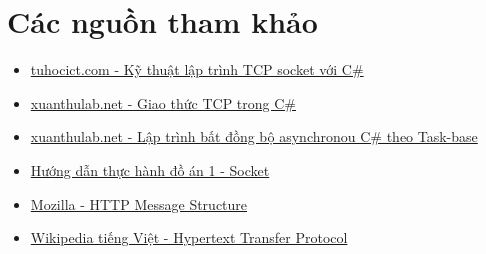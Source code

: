 \documentclass[14pt, a4paper]{extarticle}
\begin{document}
\section{Các nguồn tham khảo}
\begin{itemize}
    \item \href{https://tuhocict.com/ky-thuat-lap-trinh-voi-tcp-socket/}{tuhocict.com - Kỹ thuật lập trình TCP socket với C\#}
    \item \href{https://xuanthulab.net/networking-giao-thuc-tcp-voi-cac-lop-tcplistener-tcpclient-va-cac-lop-uri-ipaddress-c-c-sharp.html}{xuanthulab.net - Giao thức TCP trong C\#}
    \item \href{https://xuanthulab.net/lap-trinh-bat-dong-bo-asynchronou-c-c-sharp-voi-bat-dong-bo-theo-mo-hinh-tac-vu.html}{xuanthulab.net - Lập trình bất đồng bộ asynchronou C\# theo Task-base}
    \item \href{https://docs.google.com/document/d/1mjws5-vU9mzq9QgmrwzM3hi9A93vp77mgJK-Cjmy5Cs/edit#heading=h.cfrw1cej12t6}{Hướng dẫn thực hành đồ án 1 - Socket}
    \item \href{https://developer.mozilla.org/en-US/docs/Web/HTTP/Messages}{Mozilla - HTTP Message Structure}
    \item \href{https://vi.wikipedia.org/wiki/Hypertext_Transfer_Protocol}{Wikipedia tiếng Việt - Hypertext Transfer Protocol}
\end{itemize}
\end{document}
